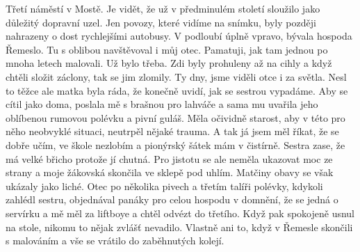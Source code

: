 
Třetí náměstí v Mostě. Je vidět, že už v předminulém století sloužilo
jako důležitý dopravní uzel. Jen povozy, které vidíme na snímku, byly
později nahrazeny o dost rychlejšími autobusy. V podloubí úplně
vpravo, bývala hospoda Řemeslo. Tu s oblibou navštěvoval i můj otec.
Pamatuji, jak tam jednou po mnoha letech malovali. Už bylo třeba. Zdi
byly prohuleny až na cihly a když chtěli složit záclony, tak se jim
zlomily. Ty dny, jsme viděli otce i za světla. Nesl to těžce ale matka
byla ráda, že konečně uvidí, jak se sestrou vypadáme. Aby se cítil
jako doma, poslala mě s brašnou pro lahváče a sama mu uvařila jeho
oblíbenou rumovou polévku a pivní guláš. Měla očividně starost, aby v
této pro něho neobvyklé situaci, neutrpěl nějaké trauma. A tak já jsem
měl říkat, že se dobře učím, ve škole nezlobím a pionýrský šátek mám v
čistírně. Sestra zase, že má velké břicho protože jí chutná. Pro
jistotu se ale neměla ukazovat moc ze strany a moje žákovská skončila
ve sklepě pod uhlím. Matčiny obavy se však ukázaly jako liché. Otec po
několika pivech a třetím talíři polévky, kdykoli zahlédl sestru,
objednával panáky pro celou hospodu v domnění, že se jedná o servírku
a mě měl za liftboye a chtěl odvézt do třetího. Když pak spokojeně
usnul na stole, nikomu to nějak zvlášť nevadilo. Vlastně ani to, když
v Řemesle skončili s malováním a vše se vrátilo do zaběhnutých kolejí.

